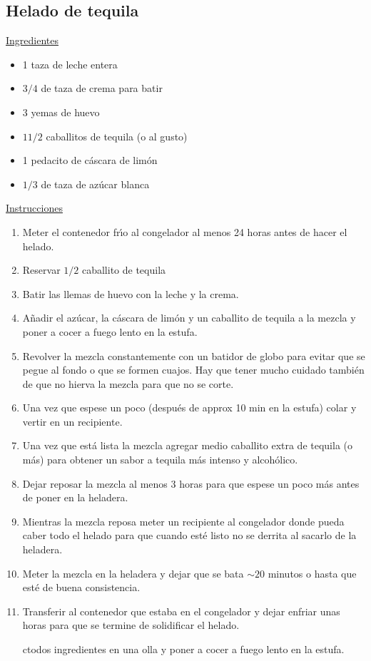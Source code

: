 \subsection{Helado de tequila}
\underline{Ingredientes}
\begin{itemize}
\item 1 taza de leche entera
\item $3/4$ de taza de crema para batir
\item 3 yemas de huevo
\item $1 1/2$ caballitos de tequila (o al gusto)
\item 1 pedacito de c\'ascara de lim\'on
\item $1/3$ de taza de az\'ucar blanca

\end{itemize}

\underline{Instrucciones}

\begin{enumerate}
\item Meter el contenedor fr\'{\i}o al congelador al menos 24 horas antes de hacer el helado.
\item Reservar $1/2$ caballito de tequila
\item Batir las llemas de huevo con la leche y la crema.
\item Añadir el az\'ucar, la c\'ascara de lim\'on y un caballito de tequila a la mezcla y poner a cocer a fuego lento en la estufa. 
\item Revolver la mezcla constantemente con un batidor de globo para evitar que se pegue al fondo o que se formen cuajos. Hay que tener mucho cuidado tambi\'en de que no hierva la mezcla para que no se corte. 
\item Una vez que espese un poco (despu\'es de approx 10 min en la estufa) colar y vertir en un recipiente.
\item Una vez que est\'a lista la mezcla agregar medio caballito extra de tequila (o m\'as) para obtener un sabor a tequila m\'as intenso y alcoh\'olico.
\item Dejar reposar la mezcla al menos 3 horas para que espese un poco m\'as antes de poner en la heladera. 
\item Mientras la mezcla reposa meter un recipiente al congelador donde pueda caber todo el helado para que cuando est\'e listo no se derrita al sacarlo de la heladera.
\item Meter la mezcla en la heladera y dejar que se bata $\sim20$ minutos o hasta que est\'e de buena consistencia.
\item Transferir al contenedor que estaba en el congelador y dejar enfriar unas horas para que se termine de solidificar el helado. 

ctodos ingredientes en una olla y poner a cocer a fuego lento en la estufa. 

\end{enumerate}

